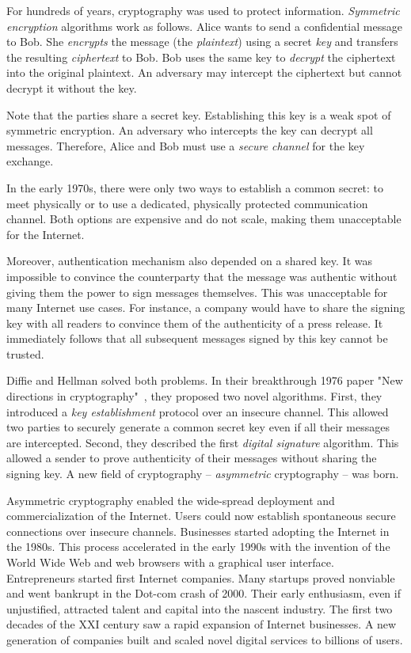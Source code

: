 For hundreds of years, cryptography was used to protect information.
\textit{Symmetric encryption} algorithms work as follows.
Alice wants to send a confidential message to Bob.
She \textit{encrypts} the message (the \textit{plaintext}) using a secret \textit{key} and transfers the resulting \textit{ciphertext} to Bob.
Bob uses the same key to \textit{decrypt} the ciphertext into the original plaintext.
An adversary may intercept the ciphertext but cannot decrypt it without the key.

Note that the parties share a secret key.
Establishing this key is a weak spot of symmetric encryption.
An adversary who intercepts the key can decrypt all messages.
Therefore, Alice and Bob must use a \textit{secure channel} for the key exchange.

In the early 1970s, there were only two ways to establish a common secret: to meet physically or to use a dedicated, physically protected communication channel.
Both options are expensive and do not scale, making them unacceptable for the Internet.

Moreover, authentication mechanism also depended on a shared key.
It was impossible to convince the counterparty that the message was authentic without giving them the power to sign messages themselves.
This was unacceptable for many Internet use cases.
For instance, a company would have to share the signing key with all readers to convince them of the authenticity of a press release.
It immediately follows that all subsequent messages signed by this key cannot be trusted.

Diffie and Hellman solved both problems.
In their breakthrough 1976 paper "New directions in cryptography"~\cite{Diffie1976}, they proposed two novel algorithms.
First, they introduced a \textit{key establishment} protocol over an insecure channel.
This allowed two parties to securely generate a common secret key even if all their messages are intercepted.
Second, they described the first \textit{digital signature} algorithm.
This allowed a sender to prove authenticity of their messages without sharing the signing key.
A new field of cryptography -- \textit{asymmetric} cryptography -- was born.

Asymmetric cryptography enabled the wide-spread deployment and commercialization of the Internet.
Users could now establish spontaneous secure connections over insecure channels.
Businesses started adopting the Internet in the 1980s.
This process accelerated in the early 1990s with the invention of the World Wide Web and web browsers with a graphical user interface.
Entrepreneurs started first Internet companies.
Many startups proved nonviable and went bankrupt in the Dot-com crash of 2000.
Their early enthusiasm, even if unjustified, attracted talent and capital into the nascent industry.
The first two decades of the XXI century saw a rapid expansion of Internet businesses.
A new generation of companies built and scaled novel digital services to billions of users.

